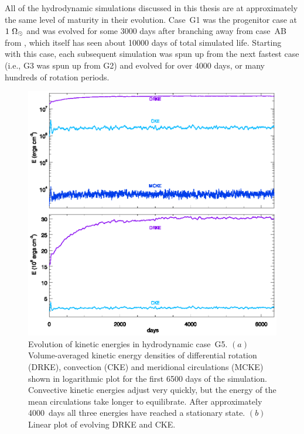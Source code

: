 All of the hydrodynamic simulations discussed in this thesis are at approximately the same
level of maturity in their evolution.  Case~G1 was the progenitor case
at $1~\Omega_\odot$ and was evolved for some 3000 days after branching
away from case~AB from \cite{Brun&Toomre_2002}, which itself has seen
about 10000 days of total simulated life.  Starting with this case,
each subsequent simulation was spun up from the next fastest case
(i.e., G3 was spun up from G2) and evolved for over 4000 days, or many
hundreds of rotation periods.  


\begin{figure}[htbp]
  \begin{center}
    \includegraphics[width=0.85\linewidth]{figs/chapter_2/apj_energy_trace_ab2_turf5.eps}
  \end{center}
  \caption[Evolution of kinetic energies in hydrodynamic case~G5]
	  {Evolution of kinetic energies in hydrodynamic case~G5. $(a)$
	  Volume-averaged kinetic energy densities of differential
	  rotation (DRKE), convection (CKE) and meridional
	  circulations (MCKE) shown in logarithmic plot for the first
	  6500 days of the simulation.  Convective
	  kinetic energies adjust very quickly, but the energy of the
	  mean circulations take longer to equilibrate.  After
	  approximately 4000~days all three energies have reached a
	  stationary state. $(b)$ Linear plot of evolving DRKE and CKE.
  \label{fig:energy_G5}}
\end{figure}

